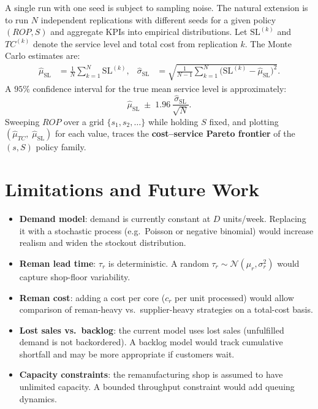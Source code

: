\documentclass[11pt]{article}
\begin{document}
A single run with one seed is subject to sampling noise.  The natural extension
is to run $N$ independent replications with different seeds for a given policy
$(ROP, S)$ and aggregate KPIs into empirical distributions.  Let
$\mathrm{SL}^{(k)}$ and $TC^{(k)}$ denote the service level and total cost from
replication $k$.  The Monte Carlo estimates are:
\begin{align}
  \hat{\mu}_{\mathrm{SL}} &= \frac{1}{N}\sum_{k=1}^{N} \mathrm{SL}^{(k)}, &
  \hat{\sigma}_{\mathrm{SL}} &= \sqrt{\frac{1}{N-1}\sum_{k=1}^{N}
    \bigl(\mathrm{SL}^{(k)} - \hat{\mu}_{\mathrm{SL}}\bigr)^2}.
\end{align}
A $95\%$ confidence interval for the true mean service level is approximately:
\begin{equation}
  \hat{\mu}_{\mathrm{SL}} \;\pm\; 1.96\,\frac{\hat{\sigma}_{\mathrm{SL}}}{\sqrt{N}}.
\end{equation}
Sweeping $ROP$ over a grid $\{s_1, s_2, \ldots\}$ while holding $S$ fixed, and
plotting $(\hat{\mu}_{TC},\; \hat{\mu}_{\mathrm{SL}})$ for each value, traces
the \textbf{cost--service Pareto frontier} of the $(s,S)$ policy family.

\section{Limitations and Future Work}

\begin{itemize}
  \item \textbf{Demand model}: demand is currently constant at $D$ units/week.
    Replacing it with a stochastic process (e.g.\ Poisson or negative binomial)
    would increase realism and widen the stockout distribution.
  \item \textbf{Reman lead time}: $\tau_r$ is deterministic.  A random
    $\tau_r \sim \mathcal{N}(\mu_r, \sigma_r^2)$ would capture shop-floor
    variability.
  \item \textbf{Reman cost}: adding a cost per core ($c_r$ per unit processed)
    would allow comparison of reman-heavy vs.\ supplier-heavy strategies on a
    total-cost basis.
  \item \textbf{Lost sales vs.\ backlog}: the current model uses lost sales
    (unfulfilled demand is not backordered).  A backlog model would track
    cumulative shortfall and may be more appropriate if customers wait.
  \item \textbf{Capacity constraints}: the remanufacturing shop is assumed to
    have unlimited capacity.  A bounded throughput constraint would add queuing
    dynamics.
\end{itemize}
\end{document}
